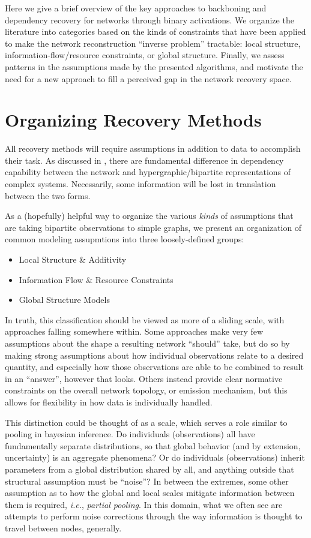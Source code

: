 \documentclass[%
	12pt,
		oneside,
		letterpaper
]{book}
\providecommand{\tightlist}{%
  \setlength{\itemsep}{0pt}\setlength{\parskip}{0pt}}\usepackage{longtable,booktabs,array}
\begin{document}
Here we give a brief overview of the key approaches to backboning and dependency recovery for networks through binary activations.
We organize the literature into categories based on the kinds of constraints that have been applied to make the network reconstruction ``inverse problem'' tractable: local structure, information-flow/resource constraints, or global structure.
Finally, we assess patterns in the assumptions made by the presented algorithms, and motivate the need for a new approach to fill a perceived gap in the network recovery space.

\section{Organizing Recovery Methods}\label{organizing-recovery-methods}

All recovery methods will require assumptions in addition to data to accomplish their task.
As discussed in \textcite{WhyHowWhen_Torres2021}, there are fundamental difference in dependency capability between the network and hypergraphic/bipartite representations of complex systems.
Necessarily, some information will be lost in translation between the two forms.

As a (hopefully) helpful way to organize the various \emph{kinds} of assumptions that are taking bipartite observations to simple graphs, we present an organization of common modeling assupmtions into three loosely-defined groups:

\begin{itemize}
\tightlist
\item
  Local Structure \& Additivity
\item
  Information Flow \& Resource Constraints
\item
  Global Structure Models
\end{itemize}

In truth, this classification should be viewed as more of a sliding scale, with approaches falling somewhere within.
Some approaches make very few assumptions about the shape a resulting network ``should'' take, but do so by making strong assumptions about how individual observations relate to a desired quantity, and especially how those observations are able to be combined to result in an ``answer'', however that looks.
Others instead provide clear normative constraints on the overall network topology, or emission mechanism, but this allows for flexibility in how data is individually handled.

This distinction could be thought of as a scale, which serves a role similar to pooling in bayesian inference.
Do individuals (observations) all have fundamentally separate distributions, so that global behavior (and by extension, uncertainty) is an aggregate phenomena?
Or do individuals (observations) inherit parameters from a global distribution shared by all, and anything outside that structural assumption must be ``noise''?
In between the extremes, some other assumption as to how the global and local scales mitigate information between them is required, \emph{i.e.}, \emph{partial pooling}.
In this domain, what we often see are attempts to perform noise corrections through the way information is thought to travel between nodes, generally.
\end{document}
